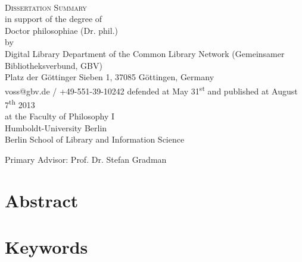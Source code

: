 \documentclass[
  12pt,twoside,BCOR=10mm
]{scrbook}
\begin{document}


\makeatletter
\begin{titlepage}
\begin{center}
\vfill
%
{\bfseries
  {\huge\strut\ignorespaces\@title}\\
  {\Large\strut\ignorespaces\@subtitle}
}
%
\baselineskip
%
\large
{\textsc{Dissertation Summary}}\\
in support of the degree of\\
Doctor philosophiae (Dr. phil.)\\
%
\baselineskip
%
by \@author\\
Digital Library Department of the Common Library Network (Gemeinsamer Bibliotheksverbund, GBV)\\
Platz der Göttinger Sieben 1, 37085 Göttingen, Germany\\
voss@gbv.de / +49-551-39-10242
%
\baselineskip
%
defended at May 31\textsuperscript{st} and
published at August 7\textsuperscript{th} 2013\\
%
%
at the Faculty of Philosophy I\\
Humboldt-University Berlin\\
Berlin School of Library and Information Science\par
{}\baselineskip
Primary Advisor: Prof. Dr. Stefan Gradman 
\end{center}
\end{titlepage}
\makeatother


\section*{Abstract}

\section*{Keywords}


\clearpage
\end{document}
